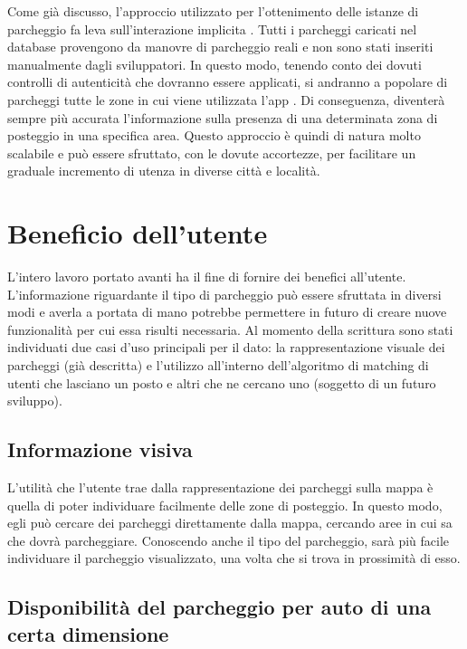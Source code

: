 Come già discusso, l'approccio utilizzato per l'ottenimento delle istanze di parcheggio
fa leva sull'interazione implicita \cite{explicating_implicit_interaction}. Tutti i 
parcheggi caricati nel database
provengono da manovre di parcheggio reali e non sono stati inseriti manualmente dagli
sviluppatori. In questo modo, tenendo conto dei dovuti controlli di autenticità che 
dovranno essere applicati, si andranno a popolare di parcheggi tutte le zone in cui 
viene utilizzata l'app \cite{crowdsourcing_geospatial_data}. Di conseguenza, diventerà 
sempre più accurata l'informazione
sulla presenza di una determinata zona di posteggio in una specifica area. Questo 
approccio è quindi di natura molto scalabile e può essere sfruttato, con le dovute
accortezze, per facilitare un graduale incremento di utenza in diverse città e 
località.

\section{Beneficio dell'utente} 

L'intero lavoro portato avanti ha il fine di fornire dei benefici all'utente.
L'informazione riguardante il tipo di parcheggio può essere sfruttata in
diversi modi e averla a portata di mano potrebbe permettere in futuro di 
creare nuove funzionalità per cui essa risulti necessaria. Al momento della
scrittura sono stati individuati due casi d'uso principali per il dato: la 
rappresentazione visuale dei parcheggi (già descritta) e l'utilizzo all'interno 
dell'algoritmo di matching di utenti che lasciano un posto e altri che ne
cercano uno (soggetto di un futuro sviluppo).

\subsection{Informazione visiva}

L'utilità che l'utente trae dalla rappresentazione dei parcheggi sulla mappa è 
quella di poter individuare facilmente delle zone di posteggio. In questo modo,
egli può cercare dei parcheggi direttamente dalla mappa, cercando aree in cui
sa che dovrà parcheggiare. Conoscendo anche il tipo del parcheggio, sarà più
facile individuare il parcheggio visualizzato, una volta che si trova in 
prossimità di esso.

\subsection{Disponibilità del parcheggio per auto di una certa dimensione}


